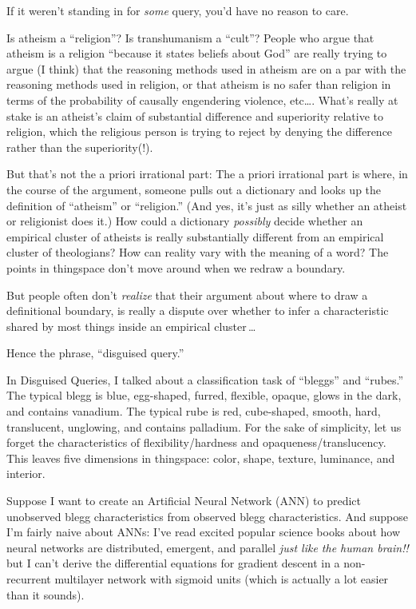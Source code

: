 {{{
 If it weren't standing in for \textit{some} query,
you'd have no reason to care.}

{
 Is atheism a ``religion''? Is
transhumanism a ``cult''? People who
argue that atheism is a religion ``because it states
beliefs about God'' are really trying to argue (I
think) that the reasoning methods used in atheism are on a par with the
reasoning methods used in religion, or that atheism is no safer than
religion in terms of the probability of causally engendering violence,
etc\ldots. What's really at stake is an
atheist's claim of substantial difference and
superiority relative to religion, which the religious person is trying
to reject by denying the difference rather than the superiority(!).}

{
 But that's not the a priori irrational part: The a
priori irrational part is where, in the course of the argument, someone
pulls out a dictionary and looks up the definition of
``atheism'' or
``religion.'' (And yes,
it's just as silly whether an atheist or religionist
does it.) How could a dictionary \textit{possibly} decide whether an
empirical cluster of atheists is really substantially different from an
empirical cluster of theologians? How can reality vary with the meaning
of a word? The points in thingspace don't move around
when we redraw a boundary.}

{
 But people often don't \textit{realize} that their
argument about where to draw a definitional boundary, is really a
dispute over whether to infer a characteristic shared by most things
inside an empirical cluster\,\ldots}

{
 Hence the phrase, ``disguised
query.''}

\myendsectiontext


{
 In Disguised Queries, I talked about a classification task of
``bleggs'' and
``rubes.'' The typical blegg is
blue, egg-shaped, furred, flexible, opaque, glows in the dark, and
contains vanadium. The typical rube is red, cube-shaped, smooth, hard,
translucent, unglowing, and contains palladium. For the sake of
simplicity, let us forget the characteristics of flexibility/hardness
and opaqueness/translucency. This leaves five dimensions in thingspace:
color, shape, texture, luminance, and interior. }

{
 Suppose I want to create an Artificial Neural Network (ANN) to
predict unobserved blegg characteristics from observed blegg
characteristics. And suppose I'm fairly naive about
ANNs: I've read excited popular science books about how
neural networks are distributed, emergent, and parallel \textit{just
like the human brain!!} but I can't derive the
differential equations for gradient descent in a non-recurrent
multilayer network with sigmoid units (which is actually a lot easier
than it sounds).}

}}
